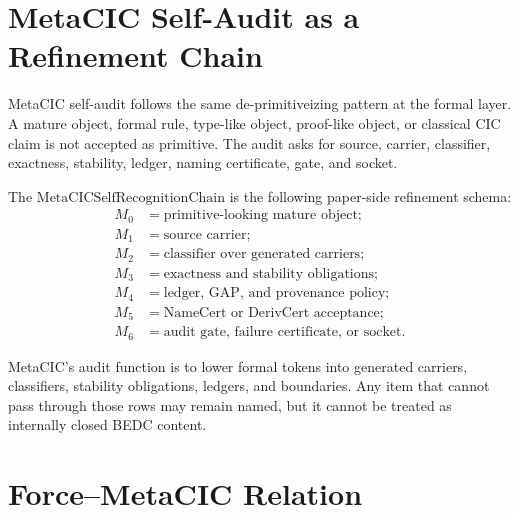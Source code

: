 \section{MetaCIC Self-Audit as a Refinement Chain}
\label{sec:layered-relation-metacic-chain}

MetaCIC self-audit follows the same de-primitiveizing pattern at the formal layer. A mature object, formal rule, type-like object, proof-like object, or classical CIC claim is not accepted as primitive. The audit asks for source, carrier, classifier, exactness, stability, ledger, naming certificate, gate, and socket.

\begin{definition}
\label{def:layered-relation-metacic-self-recognition-chain}
The $\mathrm{MetaCICSelfRecognitionChain}$ is the following paper-side refinement schema:
$$
\begin{aligned}
M_0 &= \text{primitive-looking mature object};\\
M_1 &= \text{source carrier};\\
M_2 &= \text{classifier over generated carriers};\\
M_3 &= \text{exactness and stability obligations};\\
M_4 &= \text{ledger, GAP, and provenance policy};\\
M_5 &= \text{NameCert or DerivCert acceptance};\\
M_6 &= \text{audit gate, failure certificate, or socket}.
\end{aligned}
$$
\end{definition}

\begin{principle}
\label{prin:layered-relation-metacic-deprimitiveizes-formal-tokens}
MetaCIC's audit function is to lower formal tokens into generated carriers, classifiers, stability obligations, ledgers, and boundaries. Any item that cannot pass through those rows may remain named, but it cannot be treated as internally closed BEDC content.
\end{principle}

\section{Force--MetaCIC Relation}
\label{sec:layered-relation-force-metacic}

